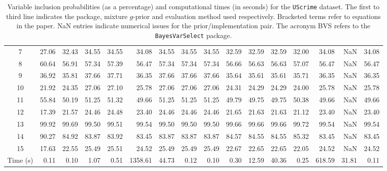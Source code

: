 \begin{sidewaystable}[h!]
\begin{center}
{\begin{tabular}{c|r|r|rrrrrr|rrrr|rrr}
				7 & 27.06 & 32.43 & 34.55 & 34.55 & 34.08 & 34.55 & 34.55 & 34.55 & 32.59 & 32.59 & 32.59 & 32.00 & 34.08 & NaN &  34.08 \\ 
				8 & 60.64 & 56.91 & 57.34 & 57.39 & 56.47 & 57.34 & 57.34 & 57.34 & 56.66 & 56.63 & 56.63 & 57.07 & 56.47 & NaN &  56.47 \\ 
				9 & 36.92 & 35.81 & 37.66 & 37.71 & 36.35 & 37.66 & 37.66 & 37.66 & 35.64 & 35.61 & 35.61 & 35.71 & 36.35 & NaN &  36.35 \\ 
				10 & 21.92 & 24.35 & 27.06 & 27.10 & 25.78 & 27.06 & 27.06 & 27.06 & 24.31 & 24.29 & 24.29 & 24.00 & 25.78 & NaN &  25.78 \\ 
				11 & 55.84 & 50.19 & 51.25 & 51.32 & 49.66 & 51.25 & 51.25 & 51.25 & 49.79 & 49.75 & 49.75 & 50.38 & 49.66 & NaN &  49.66 \\ 
				12 & 17.39 & 21.57 & 24.46 & 24.48 & 23.40 & 24.46 & 24.46 & 24.46 & 21.65 & 21.63 & 21.63 & 21.12 & 23.40 & NaN &  23.40 \\ 
				13 & 99.92 & 99.69 & 99.50 & 99.51 & 99.54 & 99.50 & 99.50 & 99.50 & 99.66 & 99.66 & 99.66 & 99.72 & 99.54 & NaN &  99.54 \\ 
				14 & 90.27 & 84.92 & 83.87 & 83.92 & 83.45 & 83.87 & 83.87 & 83.87 & 84.57 & 84.55 & 84.55 & 85.32 & 83.45 & NaN &  83.45 \\ 
				15 & 17.63 & 22.55 & 25.49 & 25.51 & 24.52 & 25.49 & 25.49 & 25.49 & 22.67 & 22.65 & 22.65 & 22.05 & 24.52 & NaN &  24.52 \\ 
				\hline
				Time (s) & 0.11 & 0.10 & 1.07 & 0.51 & 1358.61 & 44.73 & 0.12 & 0.10 & 0.30 &  12.59  & 40.36 & 0.25 & 618.59  &   31.81 & 0.11  \\
				\hline		
			\end{tabular}
		}
	\end{center}\bigskip
    \caption{Variable inclusion probabilities (as a percentage) and
        computational times (in seconds) for the {\tt UScrime} dataset.  The
        first to third line indicates the package, mixture $g$-prior and
        evaluation method used respectively. Bracketed terms refer to equations
    in the paper. NaN entries indicate numerical issues for the
prior/implementation pair. The acronym BVS refers to the {\tt BayesVarSelect}
package.}
	\label{tab:UScrime}
\end{sidewaystable}

